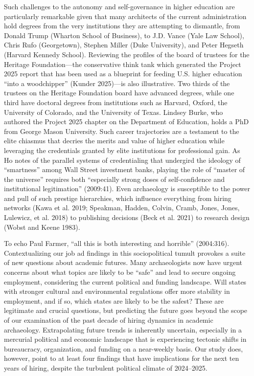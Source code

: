 \documentclass[
  12pt,
]{article}
\begin{document}
Such challenges to the autonomy and self-governance in higher education
are particularly remarkable given that many architects of the current
administration hold degrees from the very institutions they are
attempting to dismantle, from Donald Trump (Wharton School of Business),
to J.D. Vance (Yale Law School), Chris Rufo (Georgetown), Stephen Miller
(Duke University), and Peter Hegseth (Harvard Kennedy School). Reviewing
the profiles of the board of trustees for the Heritage Foundation---the
conservative think tank which generated the Project 2025 report that has
been used as a blueprint for feeding U.S. higher education ``into a
woodchipper'' (Kunder 2025)---is also illustrative. Two thirds of the
trustees on the Heritage Foundation board have advanced degrees, while
one third have doctoral degrees from institutions such as Harvard,
Oxford, the University of Colorado, and the University of Texas. Lindsey
Burke, who authored the Project 2025 chapter on the Department of
Education, holds a PhD from George Mason University. Such career
trajectories are a testament to the elite chiasmus that decries the
merits and value of higher education while leveraging the credentials
granted by elite institutions for professional gain. As Ho notes of the
parallel systems of credentialing that undergird the ideology of
``smartness'' among Wall Street investment banks, playing the role of
``master of the universe'' requires both ``especially strong doses of
self-confidence and institutional legitimation'' (2009:41). Even
archaeology is susceptible to the power and pull of such prestige
hierarchies, which influence everything from hiring networks (Kawa et
al. 2019; Speakman, Hadden, Colvin, Cramb, Jones, Jones, Lulewicz, et
al. 2018) to publishing decisions (Beck et al. 2021) to research design
(Wobst and Keene 1983).

To echo Paul Farmer, ``all this is both interesting and horrible''
(2004:316). Contextualizing our job ad findings in this sociopolitical
tumult provokes a suite of new questions about academic futures. Many
archaeologists now have urgent concerns about what topics are likely to
be ``safe'' and lead to secure ongoing employment, considering the
current political and funding landscape. Will states with stronger
cultural and environmental regulations offer more stability in
employment, and if so, which states are likely to be the safest? These
are legitimate and crucial questions, but predicting the future goes
beyond the scope of our examination of the past decade of hiring
dynamics in academic archaeology. Extrapolating future trends is
inherently uncertain, especially in a mercurial political and economic
landscape that is experiencing tectonic shifts in bureaucracy,
organization, and funding on a near-weekly basis. Our study does,
however, point to at least four findings that have implications for the
next ten years of hiring, despite the turbulent political climate of
2024--2025.
\end{document}
